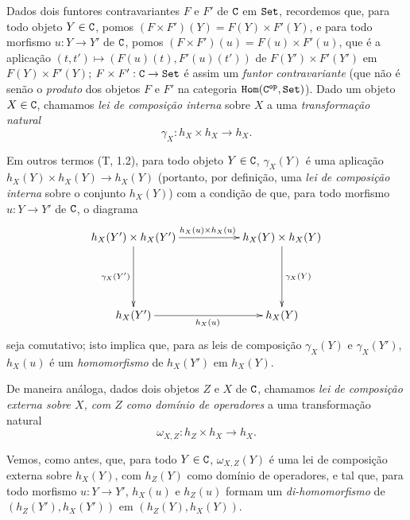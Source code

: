 \begin{env}[8.2.1]
\label{0.8.2.1}
Dados dois funtores contravariantes $F$ e $F'$ de $\mathtt{C}$ em $\mathtt{Set}$, recordemos que, para todo objeto $Y\in\mathtt{C}$, pomos $(F\times F')(Y)=F(Y)\times F'(Y)$, e para todo morfismo $u:Y\to Y'$ de $\mathtt{C}$, pomos $(F\times F')(u)=F(u)\times F'(u)$, que é a aplicação $(t,t')\mapsto(F(u)(t),F'(u)(t'))$ de $F(Y')\times F'(Y')$ em $F(Y)\times F'(Y)$; $F\times F':\C\to\Set$ é assim um \emph{funtor contravariante} (que não é senão o \emph{produto} dos objetos $F$ e $F'$ na categoria $\mathtt{Hom}(\mathtt{C}^\mathtt{op},\mathtt{Set})$).
Dado um objeto $X\in\mathtt{C}$, chamamos \emph{lei de composição interna} sobre $X$ a uma \emph{transformação natural}
\[
\label{0.8.2.1.1}
  \gamma_X:h_X\times h_X\to h_X.
  \tag{8.2.1.1}
\]

Em outros termos (T, 1.2), para todo objeto $Y\in\mathtt{C}$, $\gamma_X(Y)$ é uma aplicação $h_X(Y)\times h_X(Y)\to h_X(Y)$ (portanto, por definição, uma \emph{lei de composição interna} sobre o conjunto $h_X(Y)$) com a condição de que, para todo morfismo $u:Y\to Y'$ de $\mathtt{C}$, o diagrama
\[
  \xymatrix{
    h_X(Y')\times h_X(Y')\ar[rr]^{h_X(u)\times h_X(u)}\ar[dd]_{\gamma_X(Y')} & &
    h_X(Y)\times h_X(Y)\ar[dd]^{\gamma_X(Y)}\\\\
    h_X(Y')\ar[rr]_{h_X(u)} & &
    h_X(Y)
  }
\]
seja comutativo; isto implica que, para as leis de composição $\gamma_X(Y)$ e $\gamma_X(Y')$, $h_X(u)$ é um \emph{homomorfismo} de $h_X(Y')$ em $h_X(Y)$.

De maneira análoga, dados dois objetos $Z$ e $X$ de $\mathtt{C}$, chamamos \emph{lei de composição externa sobre $X$, com $Z$ como domínio de operadores} a uma transformação natural
\[
\label{0.8.2.1.2}
  \omega_{X,Z}:h_Z\times h_X\to h_X.
  \tag{8.2.1.2}
\]

Vemos, como antes, que, para todo $Y\in\mathtt{C}$, $\omega_{X,Z}(Y)$ é uma lei de composição externa sobre $h_X(Y)$, com $h_Z(Y)$ como domínio de operadores, e tal que, para todo morfismo $u:Y\to Y'$, $h_X(u)$ e $h_Z(u)$ formam um \emph{di-homomorfismo} de $(h_Z(Y'),h_X(Y'))$ em $(h_Z(Y),h_X(Y))$.
\end{env}

